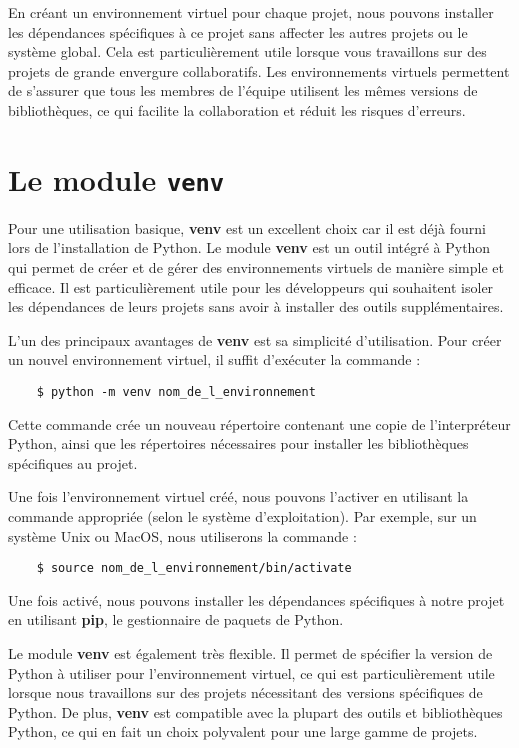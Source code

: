 En créant un environnement virtuel pour chaque projet, nous pouvons installer les dépendances spécifiques à ce projet sans affecter les autres projets ou le système global. Cela est particulièrement utile lorsque vous travaillons sur des projets de grande envergure collaboratifs. Les environnements virtuels permettent de s'assurer que tous les membres de l'équipe utilisent les mêmes versions de bibliothèques, ce qui facilite la collaboration et réduit les risques d'erreurs.

\section{Le module \texttt{venv}}
Pour une utilisation basique, \textbf{venv} est un excellent choix car il est déjà fourni lors de l'installation de Python. Le module \textbf{venv} est un outil intégré à Python qui permet de créer et de gérer des environnements virtuels de manière simple et efficace. Il est particulièrement utile pour les développeurs qui souhaitent isoler les dépendances de leurs projets sans avoir à installer des outils supplémentaires.

L'un des principaux avantages de \textbf{venv} est sa simplicité d'utilisation. Pour créer un nouvel environnement virtuel, il suffit d'exécuter la commande :
\begin{verbatim}
    $ python -m venv nom_de_l_environnement
\end{verbatim}

Cette commande crée un nouveau répertoire contenant une copie de l'interpréteur Python, ainsi que les répertoires nécessaires pour installer les bibliothèques spécifiques au projet.

Une fois l'environnement virtuel créé, nous pouvons l'activer en utilisant la commande appropriée (selon le système d'exploitation). Par exemple, sur un système Unix ou MacOS, nous utiliserons la commande :
\begin{verbatim}
    $ source nom_de_l_environnement/bin/activate
\end{verbatim}

Une fois activé, nous pouvons installer les dépendances spécifiques à notre projet en utilisant \textbf{pip}, le gestionnaire de paquets de Python.

Le module \textbf{venv} est également très flexible. Il permet de spécifier la version de Python à utiliser pour l'environnement virtuel, ce qui est particulièrement utile lorsque nous travaillons sur des projets nécessitant des versions spécifiques de Python. De plus, \textbf{venv} est compatible avec la plupart des outils et bibliothèques Python, ce qui en fait un choix polyvalent pour une large gamme de projets.

